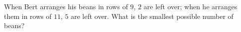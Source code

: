 When Bert arranges his beans in rows of $9$, $2$ are left over; when he arranges them in rows of $11$, $5$ are left over. What is the smallest possible number of beans?
